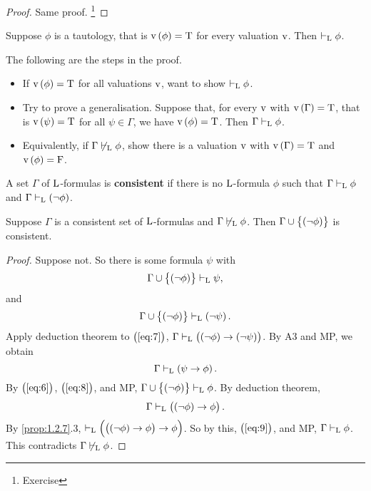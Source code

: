 \begin{proof}
Same proof. \footnote{Exercise}
\end{proof}

\begin{theorem}
\label{thm:1.3.4}
Suppose $ \phi $ is a tautology, that is $ \v\br{\phi} = \T $ for every valuation $ \mathrm{v} $. Then $ \vdash_{\mathrm{L}} \phi $.
\end{theorem}

\begin{remark}
The following are the steps in the proof.
\begin{itemize}
\item If $ \v\br{\phi} = \T $ for all valuations $ \mathrm{v} $, want to show $ \vdash_{\mathrm{L}} \phi $.
\item Try to prove a generalisation. Suppose that, for every $ \mathrm{v} $ with $ \v\br{\Gamma} = \T $, that is $ \v\br{\psi} = \T $ for all $ \psi \in \Gamma $, we have $ \v\br{\phi} = \T $. Then $ \Gamma \vdash_{\mathrm{L}} \phi $.
\item Equivalently, if $ \Gamma \not\vdash_{\mathrm{L}} \phi $, show there is a valuation $ \mathrm{v} $ with $ \v\br{\Gamma} = \T $ and $ \v\br{\phi} = \F $.
\end{itemize}
\end{remark}

\begin{definition}
A set $ \Gamma $ of $ \mathrm{L} $-formulas is \textbf{consistent} if there is no $ \mathrm{L} $-formula $ \phi $ such that $ \Gamma \vdash_{\mathrm{L}} \phi $ and $ \Gamma \vdash_\L \notb{\phi} $.
\end{definition}

\begin{proposition}
\label{prop:1.3.7}
Suppose $ \Gamma $ is a consistent set of $ \mathrm{L} $-formulas and $ \Gamma \not\vdash_{\mathrm{L}} \phi $. Then $ \Gamma \cup \cbr{\notb{\phi}} $ is consistent.
\end{proposition}

\begin{proof}
Suppose not. So there is some formula $ \psi $ with
\begin{equation}
\label{eq:6}
\Gamma \cup \cbr{\notb{\phi}} \vdash_\L \psi,
\end{equation}
and
\begin{equation}
\label{eq:7}
\Gamma \cup \cbr{\notb{\phi}} \vdash_\L \notb{\psi}.
\end{equation}
Apply deduction theorem to $ \br{\ref{eq:7}} $, $ \Gamma \vdash_\L \impb{\notb{\phi}}{\notb{\psi}} $. By A3 and MP, we obtain
\begin{equation}
\label{eq:8}
\Gamma \vdash_\L \impb{\psi}{\phi}.
\end{equation}
By $ \br{\ref{eq:6}} $, $ \br{\ref{eq:8}} $, and MP, $ \Gamma \cup \cbr{\notb{\phi}} \vdash_\L \phi $. By deduction theorem,
\begin{equation}
\label{eq:9}
\Gamma \vdash_\L \impb{\notb{\phi}}{\phi}.
\end{equation}
By \ref{prop:1.2.7}.$ 3 $, $ \vdash_\L \impb{\impb{\notb{\phi}}{\phi}}{\phi} $. So by this, $ \br{\ref{eq:9}} $, and MP, $ \Gamma \vdash_{\mathrm{L}} \phi $. This contradicts $ \Gamma \not\vdash_{\mathrm{L}} \phi $.
\end{proof}

